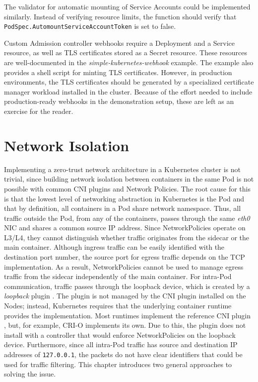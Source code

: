 \documentclass[english, 12pt, a4paper, sci, utf8, a-2b, online]{aaltothesis}
\begin{document}


The validator for automatic mounting of Service Accounts could be implemented similarly.
Instead of verifying resource limits, the function should verify that \lstinline{PodSpec.AutomountServiceAccountToken} is set to false.

Custom Admission controller webhooks require a Deployment and a Service resource, as well as TLS certificates stored as a Secret resource.
These resources are well-documented in the \emph{simple-kubernetes-webhook} example.
The example also provides a shell script for minting TLS certificates.
However, in production environments, the TLS certificates should be generated by a specialized certificate manager workload installed in the cluster.
Because of the effort needed to include production-ready webhooks in the demonstration setup, these are left as an exercise for the reader.

\clearpage

\section{Network Isolation} \label{sec:network-solution}

Implementing a zero-trust network architecture in a Kubernetes cluster is not trivial, since building network isolation between containers in the same Pod is not possible with common CNI plugins and Network Policies.
The root cause for this is that the lowest level of networking abstraction in Kubernetes is the Pod and that by definition, all containers in a Pod share network namespace.
Thus, all traffic outside the Pod, from any of the containers, passes through the same \emph{eth0} NIC and shares a common source IP address.
Since NetworkPolicies operate on L3/L4, they cannot distinguish whether traffic originates from the sidecar or the main container.
Although ingress traffic can be easily identified with the destination port number, the source port for egress traffic depends on the TCP implementation.
As a result, NetworkPolicies cannot be used to manage egress traffic from the sidecar independently of the main container.
For intra-Pod communication, traffic passes through the loopback device, which is created by a \emph{loopback} plugin \cite{k8s-docs-cni}.
The plugin is not managed by the CNI plugin installed on the Nodes; instead, Kubernetes requires that the underlying container runtime provides the implementation.
Most runtimes implement the reference CNI plugin \cite{cni-loopback}, but, for example, CRI-O implements its own.
Due to this, the plugin does not install with a controller that would enforce NetworkPolicies on the loopback device.
Furthermore, since all intra-Pod traffic has source and destination IP addresses of \lstinline{127.0.0.1}, the packets do not have clear identifiers that could be used for traffic filtering.
This chapter introduces two general approaches to solving the issue.
\end{document}
